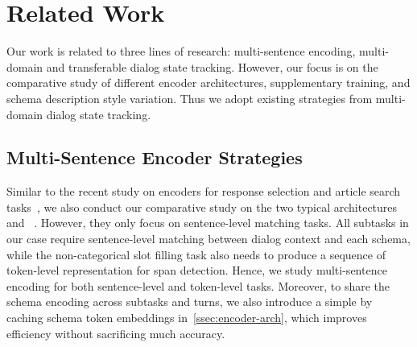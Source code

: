 \section{Related Work}
\label{sec:sgd:related-work}
Our work is related to three lines of research: multi-sentence
encoding, multi-domain and transferable dialog state
tracking. However, our focus is on the comparative study of different
encoder architectures, supplementary training, and schema
description style variation. Thus we adopt existing strategies from
multi-domain dialog state tracking.

\subsection{Multi-Sentence Encoder Strategies}
\label{ssec:sgd:multi-encoder}
Similar to the recent study on encoders for response selection and
article search tasks~\citet{humeau2019poly}, we also conduct our
comparative study on the two typical architectures
\CE~\cite{bordes2014open, lowe2015ubuntu} and
\DE~\cite{wu2017sequential,yang2018response}. However, they only focus
on sentence-level matching tasks. All subtasks in our case require
sentence-level matching between dialog context and each schema, while
the non-categorical slot filling task also needs to produce a sequence
of token-level representation for span detection. Hence, we study
multi-sentence encoding for both sentence-level and token-level
tasks. Moreover, to share the schema encoding across subtasks and
turns, we also introduce a simple \FE by caching schema token
embeddings in~\autoref{ssec:encoder-arch}, which improves efficiency
without sacrificing much accuracy.

